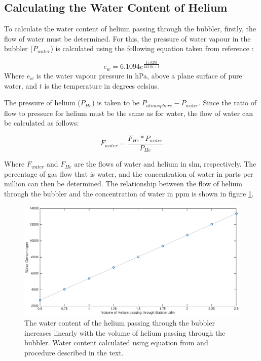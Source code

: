 \documentclass[11pt, oneside]{article}   	%
\begin{document}
\subsection{Calculating the Water Content of Helium}
\label{subsec:CalculatingWaterContent}


To calculate the water content of helium passing through the bubbler, firstly, the flow of water must be determined. For this, the pressure of water vapour in the bubbler ($P_{water}$) is calculated using the following equation taken from reference \cite{Alduchov1996}:

\begin{equation}
	e_w = 6.1094 e^{\frac{17.625t}{243.04 + t}}
\end{equation}
Where $e_w$ is the water vapour pressure in hPa, above a plane surface of pure water, and $t$ is the temperature in degrees celsius.

The pressure of helium ($P_{He}$) is taken to be $P_{atmosphere} - P_{water}$. Since the ratio of flow to pressure for helium must be the same as for water, the flow of water can be calculated as follows:

\begin{equation}
    F_{water} = \frac{F_{He} * P_{water}}{P_{He}}
\end{equation}

Where $F_{water}$ and $F_{He}$ are the flows of water and helium in slm, respectively. The percentage of gas flow that is water, and the concentration of water in parts per million can then be determined.
The relationship between the flow of helium through the bubbler and the concentration of water in ppm is shown in figure \ref{fig:WaterContent}.

\begin{figure}
    \centering
    \includegraphics[width=\textwidth]{Figures/WaterContent.eps}
    \caption{The water content of the helium passing through the bubbler increases linearly with the volume of helium passing through the bubbler. Water content calculated using equation from \cite{Alduchov1996} and procedure described in the text.}
    \label{fig:WaterContent}
\end{figure}
\end{document}
